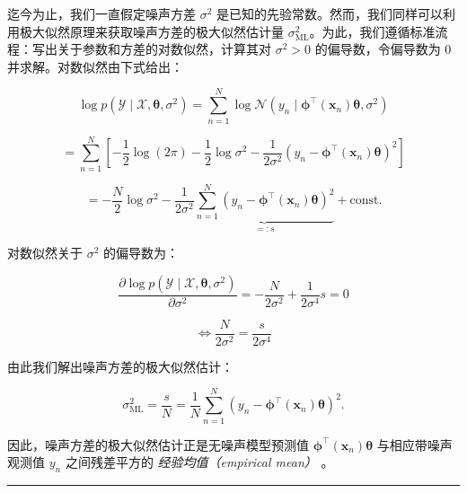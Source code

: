迄今为止，我们一直假定噪声方差 $ \sigma^2 $ 是已知的先验常数。然而，我们同样可以利用极大似然原理来获取噪声方差的极大似然估计量 $ \sigma_{\text{ML}}^2 $。为此，我们遵循标准流程：写出关于参数和方差的对数似然，计算其对 $ \sigma^2 > 0 $ 的偏导数，令偏导数为 0 并求解。对数似然由下式给出：

\begin{equation}
\log p(\mathcal{Y} \mid \mathcal{X}, \boldsymbol{\theta}, \sigma^2) = \sum_{n=1}^N \log \mathcal{N}\left(y_n \mid \boldsymbol{\phi}^\top(\boldsymbol{x}_n)\boldsymbol{\theta}, \sigma^2\right)
\tag{9.20a}
\end{equation}

\begin{equation}
= \sum_{n=1}^N \left[ -\frac{1}{2}\log(2\pi) - \frac{1}{2}\log \sigma^2 - \frac{1}{2\sigma^2}(y_n - \boldsymbol{\phi}^\top(\boldsymbol{x}_n)\boldsymbol{\theta})^2 \right]
\tag{9.20b}
\end{equation}

\begin{equation}
= -\frac{N}{2}\log \sigma^2 - \frac{1}{2\sigma^2}\underbrace{\sum_{n=1}^N (y_n - \boldsymbol{\phi}^\top(\boldsymbol{x}_n)\boldsymbol{\theta})^2}_{=: s} + \text{const} .
\tag{9.20c}
\end{equation}

对数似然关于 $ \sigma^2 $ 的偏导数为：

\begin{equation}
\frac{\partial \log p(\mathcal{Y} \mid \mathcal{X}, \boldsymbol{\theta}, \sigma^2)}{\partial \sigma^2} = -\frac{N}{2\sigma^2} + \frac{1}{2\sigma^4}s = 0
\tag{9.21a}
\end{equation}

\begin{equation}
\iff \frac{N}{2\sigma^2} = \frac{s}{2\sigma^4}
\tag{9.21b}
\end{equation}

由此我们解出噪声方差的极大似然估计：

\begin{equation}
\sigma_{\text{ML}}^2 = \frac{s}{N} = \frac{1}{N}\sum_{n=1}^N (y_n - \boldsymbol{\phi}^\top(\boldsymbol{x}_n)\boldsymbol{\theta})^2 .
\tag{9.22}
\end{equation}

因此，噪声方差的极大似然估计正是无噪声模型预测值 $ \boldsymbol{\phi}^\top(\boldsymbol{x}_n)\boldsymbol{\theta} $ 与相应带噪声观测值 $ y_n $ 之间残差平方的 \emph{经验均值（empirical mean）} 。

\medskip\hrule\medskip

